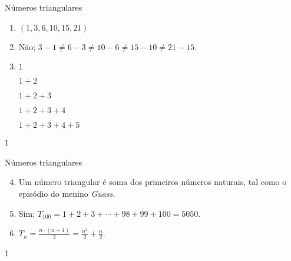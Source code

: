 \begin{answer}{Números triangulares}
{
\begin{enumerate}
\item {} 
\((1,3,6,10,15,21)\)

\item {} 
Não; \(3-1 \neq 6-3 \neq 10-6 \neq 15-10 \neq 21-15\).

\item {} 
\(1\)

\(1+2\)

\(1+2+3\)

\(1+2+3+4\)

\(1+2+3+4+5\)
\end{enumerate}
}{1}
\end{answer}
\clearmargin
\begin{answer}{Números triangulares}
{
\begin{enumerate}\setcounter{enumi}{3}
\item Um número triangular é soma dos primeiros números naturais, tal como o episódio do menino \textit{Guass}.

\item {} 
Sim; \(T_{100}=1+2+3+ \cdots +98+99+100=5050\).

\item {} 
\(T_{n}= \frac{n \cdot (n+1)}{2}= \frac{n^2}{2} + \frac{n}{2}\).
\end{enumerate}
}{1}
\end{answer}

\label{\detokenize{AF209-4::doc}}\label{\detokenize{AF209-4:para-saber-mais}}

